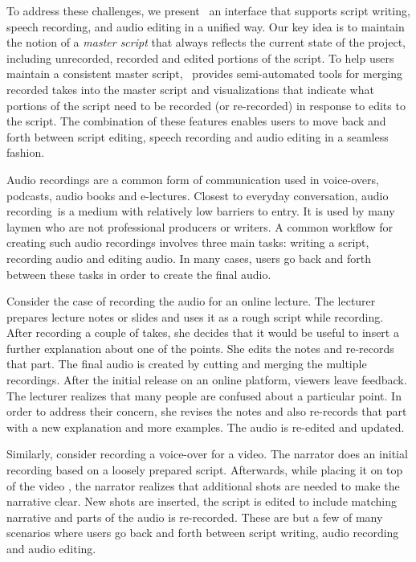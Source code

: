 To address these challenges, we present \systemname\, an interface that supports script writing, speech recording, and audio editing in a unified way. Our key idea is to maintain the notion of a \emph{master script} that always reflects the current state of the project, including unrecorded, recorded and edited portions of the script. To help users maintain a consistent master script, \systemname\ provides semi-automated tools for merging recorded takes into the master script and visualizations that indicate what portions of the script need to be recorded (or re-recorded) in response to edits to the script. The combination of these features enables users to move back and forth between script editing, speech recording and audio editing in a seamless fashion.



Audio recordings are a common form of communication used in voice-overs, podcasts, audio books and e-lectures. Closest to everyday conversation, audio recording\ is a medium with relatively low barriers to entry. It is used by many laymen who are not professional producers or writers. A common workflow for creating such audio recordings involves three main tasks: writing a script, recording audio and editing audio. In many cases, users go back and forth between these tasks in order to create the final audio. 

Consider the case of recording the audio for an online lecture. The lecturer prepares lecture notes or slides and uses it as a rough script while recording. After recording a couple of takes, she decides that it would be useful to insert a further explanation about one of the points. She edits the notes and re-records that part. The final audio is created by cutting and merging the multiple recordings. After the initial release on an online platform, viewers leave feedback. The lecturer realizes that many people are confused about a particular point. In order to address their concern, she revises the notes and also  re-records that part with a new explanation and more examples. The audio is re-edited and updated. 

Similarly, consider recording a voice-over for a video. The narrator does an initial recording based on a loosely prepared script. Afterwards, while placing it on top of the video , the narrator realizes that additional shots are needed to make the narrative clear. New shots are inserted, the script is edited to include matching narrative and parts of the audio is re-recorded.
These are but a few of many scenarios where
users go back and forth between script writing, audio
recording and audio editing.



